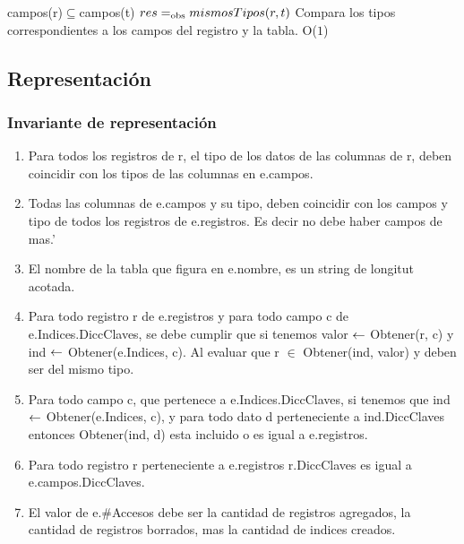  {campos(r)$\subseteq$campos(t)}%
 {$res =_{\mathrm{obs}} mismosTipos(r,t)$}
 {Compara los tipos correspondientes a los campos del registro y la tabla.}
 {O($1$)}%
 {} 
 
\subsection{Representación}



  
\subsubsection*{Invariante de representación}

\begin{enumerate}
  \item Para todos los registros de r, el tipo de los datos de las columnas de r, deben coincidir con los tipos de las columnas en e.campos.
  \item Todas las columnas de e.campos y su tipo, deben coincidir con los campos y tipo de todos los registros de e.registros. Es decir no debe haber campos de mas.'
  \item El nombre de la tabla que figura en e.nombre, es un string de longitut acotada.
  \item Para todo registro r de e.registros y para todo campo c de e.Indices.DiccClaves, se debe cumplir que si tenemos valor $\leftarrow$ Obtener(r, c) y ind $\leftarrow$ Obtener(e.Indices, c). Al evaluar que r $\in$ Obtener(ind, valor) y deben ser del mismo tipo.
  \item Para todo campo c, que pertenece a e.Indices.DiccClaves, si tenemos que  ind $\leftarrow$ Obtener(e.Indices, c), y para todo dato d perteneciente a ind.DiccClaves entonces Obtener(ind, d) esta incluido o es igual a e.registros.
  \item Para todo registro r perteneciente  a e.registros r.DiccClaves es igual a e.campos.DiccClaves.
  \item El valor de e.\#Accesos debe ser la cantidad de registros agregados, la cantidad de registros borrados, mas la cantidad de indices creados.
\end{enumerate}


